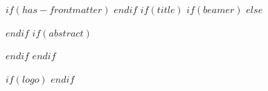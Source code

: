 $if(has-frontmatter)$
\frontmatter
$endif$
$if(title)$
$if(beamer)$
\frame{\titlepage}
$else$
\maketitle
$endif$
$if(abstract)$
\begin{abstract}
$abstract$
\end{abstract}
$endif$
$endif$

\pagestyle{fancy}
\thispagestyle{fancy}
\fancyhf{}

\fancyhead[L]{}
\fancyhead[C]{\curso \\ \universidad\vfill}
\fancyhead[R]{\laboratorio\vfill}


$if(logo)$
  \newcommand{\logo}{$logo$}
$endif$